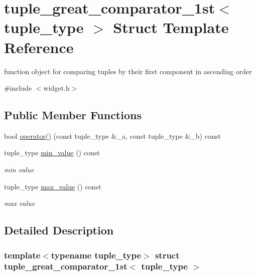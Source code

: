 \hypertarget{structtuple__great__comparator__1st}{}\section{tuple\+\_\+great\+\_\+comparator\+\_\+1st$<$ tuple\+\_\+type $>$ Struct Template Reference}
\label{structtuple__great__comparator__1st}


function object for comparing tuples by their first component in ascending order  




{\ttfamily \#include $<$widget.\+h$>$}

\subsection*{Public Member Functions}
\begin{DoxyCompactItemize}
\item 
bool \hyperlink{structtuple__great__comparator__1st_ab62e5503d2af02a4f2383b54217659bb}{operator()} (const tuple\+\_\+type \&\+\_\+a, const tuple\+\_\+type \&\+\_\+b) const
\item 
tuple\+\_\+type \hyperlink{structtuple__great__comparator__1st_a92e31ba8514dbfb3a98e9bf9fdccaf31}{min\+\_\+value} () const
\begin{DoxyCompactList}\small\item\em min value \end{DoxyCompactList}\item 
tuple\+\_\+type \hyperlink{structtuple__great__comparator__1st_ace19155455686003f7a67d51d5bb799b}{max\+\_\+value} () const
\begin{DoxyCompactList}\small\item\em max value \end{DoxyCompactList}\end{DoxyCompactItemize}


\subsection{Detailed Description}
\subsubsection*{template$<$typename tuple\+\_\+type$>$\newline
struct tuple\+\_\+great\+\_\+comparator\+\_\+1st$<$ tuple\+\_\+type $>$}

